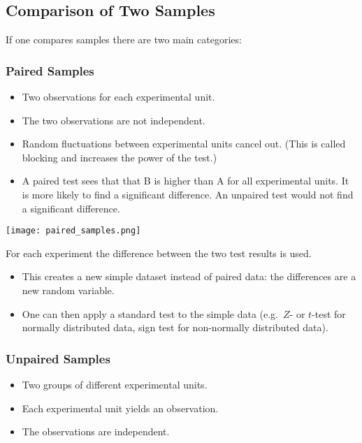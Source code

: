\subsection{Comparison of Two Samples}

If one compares samples there are two main categories:

\subsubsection{Paired Samples}

\begin{itemize}
    \item Two observations for each experimental unit.
    \item The two observations are not independent.
    \item Random fluctuations between experimental units cancel out. (This is called blocking and increases the power of the test.)
    \item A paired test sees that that B is higher than A for all experimental units. It is more likely to find a significant difference. An unpaired test would not find a significant difference.
\end{itemize}

\begin{center}
    \texttt{[image: paired\_samples.png]}
\end{center}

\newpar{}

For each experiment the difference between the two test results is used.
\begin{itemize}
    \item This creates a new simple dataset instead of paired data: the differences are a new random variable.
    \item One can then apply a standard test to the simple data (e.g.\ $Z$- or $t$-test for normally distributed data, sign test for non-normally distributed data).
\end{itemize}

\subsubsection{Unpaired Samples}

\begin{itemize}
    \item Two groups of different experimental units.
    \item Each experimental unit yields an observation.
    \item The observations are independent.
\end{itemize}

